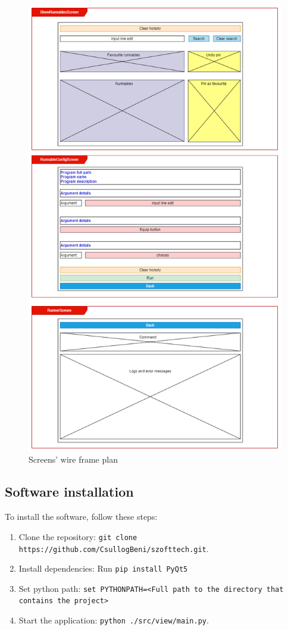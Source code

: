 \documentclass{article}
\begin{document}
\begin{figure}[h]
    \centering
    \includegraphics[width=0.9\linewidth]{img/wire_frame_plan.drawio.png}
    \caption{Screens' wire frame plan}
    \label{fig:viewwireframe}
\end{figure}

\FloatBarrier

\subsection{Software installation}

To install the software, follow these steps:

\begin{enumerate}
    \item Clone the repository\@: \texttt{git clone https://github.com/CsullogBeni/szofttech.git}.
    \item Install dependencies\@: Run \texttt{pip install PyQt5}%
    \item Set python path: \texttt{set PYTHONPATH=<Full path to the directory that contains the project>}
    \item Start the application\@: \texttt{python ./src/view/main.py}.
\end{enumerate}
\end{document}
